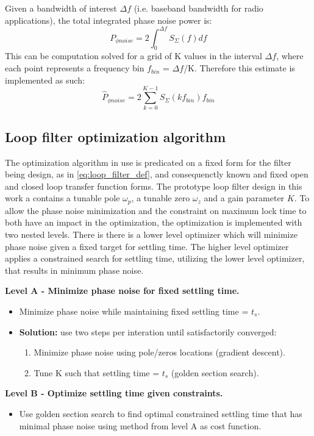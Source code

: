 	Given a bandwidth of interest $\Delta f$ (i.e. baseband bandwidth for radio applications), the total integrated phase noise power is:
	\begin{equation}
		P_{\phi noise} = 2\int_0^{\Delta f} S_{\Sigma}(f)df
	\end{equation}
	This can be computation solved for a grid of K values in the interval $\Delta f$, where each point represents a frequency bin $f_{bin}$ = $\Delta f$/K. Therefore this estimate is implemented as such:
	\begin{equation}
		\hat{P}_{\phi noise} = 2\sum_{k=0}^{K-1} S_{\Sigma}(kf_{bin})f_{bin}
	\end{equation}

\subsection{Loop filter optimization algorithm}
	The optimization algorithm in use is predicated on a fixed form for the filter being design, as in \ref{eq:loop_filter_def}, and consequenctly known and fixed open and closed loop transfer function forms. The prototype loop filter design in this work a contains a tunable pole $\omega_p$, a tunable zero $\omega_z$ and a gain parameter $K$. To allow the phase noise minimization and the constraint on maximum lock time to both have an impact in the optimization, the optimization is implemented with two nested levels. There is there is a lower level optimizer which will minimize phase noise given a fixed target for settling time. The higher level optimizer applies a constrained search for settling time, utilizing the lower level optimizer, that results in minimum phase noise. 

	\textbf{Level A - Minimize phase noise for fixed settling time.}\label{lf_opt}
	\begin{itemize}
		\setlength\itemsep{-0.8em}
		\item Minimize phase noise while maintaining fixed settling time = $t_s$.
		\item \textbf{Solution:} use two steps per interation until satisfactorily converged:
		\begin{enumerate}
			\setlength\itemsep{-0.8em}
			\item Minimize phase noise using pole/zeros locations (gradient descent).
			\item Tune K such that settling time = $t_s$ (golden section search).
		\end{enumerate}

	\end{itemize}
	\textbf{Level B - Optimize settling time given constraints.}
	\begin{itemize}
		\setlength\itemsep{-0.8em}
		\item Use golden section search to find optimal constrained settling time that has minimal phase noise using method from level A as cost function.
	\end{itemize} 

